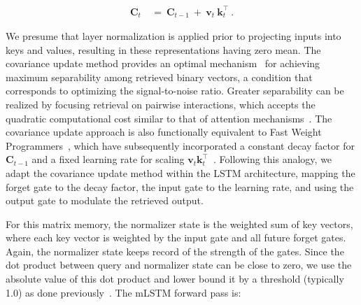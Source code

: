\begin{align}
\mathbf{C}_t \ &= \ \mathbf{C}_{t-1} \ + \ \mathbf{v}_{t} \ \mathbf{k}_t^\top \ .
\end{align}

We presume that layer normalization is applied prior to projecting inputs into keys and values, resulting in these representations having zero mean. The covariance update method provides an optimal mechanism~\citep{Dayan:91} for achieving maximum separability among retrieved binary vectors, a condition that corresponds to optimizing the signal-to-noise ratio. Greater separability can be realized by focusing retrieval on pairwise interactions, which accepts the quadratic computational cost similar to that of attention mechanisms~\citep{Krotov:16,Krotov:17,Ramsauer:21}. The covariance update approach is also functionally equivalent to Fast Weight Programmers~\citep{Schmidhuber:92ncfastweights,Schlag:21}, which have subsequently incorporated a constant decay factor for $\mathbf{C}_{t-1}$ and a fixed learning rate for scaling 
$\mathbf{v}_{t} \mathbf{k}_t ^\top$~\citep{Ba:16}.
Following this analogy, we adapt the covariance update method within the LSTM architecture, mapping the forget gate to the decay factor, the input gate to the learning rate, and using the output gate to modulate the retrieved output.

For this matrix memory, the normalizer state is the weighted sum of key vectors, where each key vector is weighted by the input gate and all future forget gates. Again, the normalizer state keeps record of the strength of the gates. Since the dot product between query and normalizer state can be close to zero, we use the absolute value of this dot product and lower bound it by a threshold (typically 1.0) as done previously~\citep{Sun:23arxiv}. The mLSTM forward pass is:

